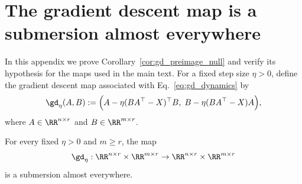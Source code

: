 \documentclass{article}
\begin{document}
\section{The gradient descent map is a submersion almost everywhere}
\label{apdx:gd_submersion}

In this appendix we prove Corollary~\ref{cor:gd_preimage_null} and verify its
hypothesis for the maps used in the main text. For a fixed step size $\eta>0$, define the
gradient descent map associated with  Eq.~\eqref{eq:gd_dynamics} by
\begin{align}
\gd_\eta(A,B)
:=
\Bigl(
A - \eta (BA^\top - X)^\top B,\;
B - \eta (BA^\top - X)A
\Bigr),
\end{align}
where $A\in \RR^{n\times r}$ and $B\in \RR^{m\times r}$.

\begin{proposition}
\label{prop:gd_submersion_ae}
For every fixed $\eta>0$ and $m \ge r$, the map
\begin{align}
\gd_\eta:\RR^{n\times r}\times \RR^{m\times r}
\to
\RR^{n\times r}\times \RR^{m\times r}
\end{align}
is a submersion almost everywhere.
\end{proposition}
\end{document}
